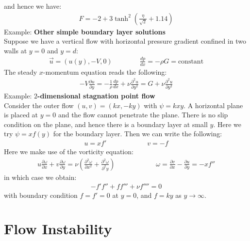 \documentclass[11pt]{book}
\theoremstyle{break}
\theoremstyle{break}
\newcommand{\pd}{\partial}
\newcommand{\example}{\color{green}Example: \color{black}}
\begin{document}
and hence we have:
\begin{align*}
F = -2 + 3\tanh^2\left( \frac{\eta}{\sqrt{2}}+ 1.14\right)
\end{align*}
\example \textbf{Other simple boundary layer solutions}\\
Suppose we have a vertical flow with horizontal pressure gradient confined in two walls at $y=0$ and $y=d$:
\begin{align*}
\vec{u} = (u(y), -V, 0) \qquad\qquad \frac{dp}{dx} = -\rho G = \text{constant}
\end{align*}
The steady $x$-momentum equation reads the following:
\begin{align*}
-V \frac{\pd u}{\pd y} = -\frac{1}{\rho} \frac{dp}{dx} + \nu \frac{\pd^2 u}{\pd y^2} = G+ \nu \frac{\pd^2 u}{\pd y^2}
\end{align*}
\newpage
\example \textbf{$2$-dimensional stagnation point flow}\\
Consider the outer flow $(u,v) = (kx, -ky)$ with $\psi = kxy$. A horizontal plane is placed at $y = 0$ and the flow cannot penetrate the plane. There is no slip condition on the plane, and hence there is a boundary layer at small $y$. Here we try $\psi = xf(y)$ for the boundary layer. Then we can write the following:
\begin{align*}
u = xf' \qquad\qquad\qquad v = -f
\end{align*}
Here we make use of the vorticity equation:
\begin{align*}
u \frac{\pd \omega}{\pd x} + v\frac{\pd \omega}{\pd y} = \nu \left( \frac{\pd^2 \omega}{\pd x^2}+ \frac{\pd^2 \omega}{\pd^2 y}\right) \qquad\qquad\qquad \omega = \frac{\pd v}{\pd x}- \frac{\pd u}{\pd y} = -xf''
\end{align*}
in which case we obtain:
\begin{align*}
-f' f'' + ff''' + \nu f'''' = 0
\end{align*}
with boundary condition $f = f' = 0$ at $y = 0$, and $f=ky$ as $y \to \infty$. 

\newpage
\chapter{Flow Instability}
\end{document}

